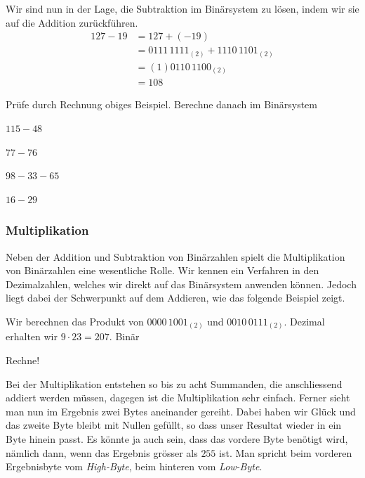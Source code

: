 \documentclass[%
11pt,%
twoside,%
titlepage,%
german,%
headsepline%
]{scrartcl}
\begin{document}
Wir sind nun in der Lage, die Subtraktion im Binärsystem zu lösen, indem wir sie auf die Addition zurückführen.
\begin{align*}
127-19&=127+(-19)\\
&=0111\,1111_{(2)} + 1110\,1101_{(2)}\\
&=(1)0110\,1100_{(2)}\\
&=108
\end{align*}
\begin{ueb}
Prüfe durch Rechnung obiges Beispiel. Berechne danach im Binärsystem

\begin{minipage}{0.23\textwidth}
\begin{enumeratea}
\item $115-48$
\item $77-76$
\end{enumeratea}
\end{minipage}
\begin{minipage}{0.23\textwidth}
\begin{enumeratea}
\addtocounter{enumi}{2}
\item $98-33-65$
\item $16-29$
\end{enumeratea}
\end{minipage}
\end{ueb}

\subsubsection{Multiplikation}
Neben der Addition und Subtraktion von Binärzahlen spielt die Multiplikation von Binärzahlen eine wesentliche Rolle. Wir kennen ein Verfahren in den Dezimalzahlen, welches wir direkt auf das Binärsystem anwenden können. Jedoch liegt dabei der Schwerpunkt auf dem Addieren, wie das folgende Beispiel zeigt.
\begin{bsp}
Wir berechnen das Produkt von $0000\,1001_{(2)}$ und $0010\,0111_{(2)}$. Dezimal erhalten wir $9\cdot23=207$. Binär

\begin{ueb}
Rechne!
\end{ueb}

\end{bsp}
Bei der Multiplikation entstehen so bis zu acht Summanden, die anschliessend addiert werden müssen, dagegen ist die Multiplikation sehr einfach. Ferner sieht man nun im Ergebnis zwei Bytes aneinander gereiht. Dabei haben wir Glück und das zweite Byte bleibt mit Nullen gefüllt, so dass unser Resultat wieder in ein Byte hinein passt. Es könnte ja auch sein, dass das vordere Byte benötigt wird, nämlich dann, wenn das Ergebnis grösser als $255$ ist. Man spricht beim vorderen Ergebnisbyte vom \emph{High-Byte}, beim hinteren vom \emph{Low-Byte}.
\end{document}
